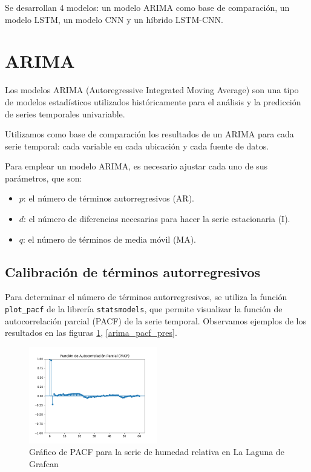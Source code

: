 Se desarrollan 4 modelos: un modelo ARIMA como base de comparación, un modelo LSTM, un modelo CNN y un híbrido LSTM-CNN.

\section{ARIMA}
Los modelos ARIMA (Autoregressive Integrated Moving Average) son una tipo de modelos estadísticos utilizados históricamente para el análisis y la predicción de series temporales
univariable. 

Utilizamos como base de comparación los resultados de un ARIMA para cada serie temporal: cada variable en cada ubicación y cada fuente de datos.

Para emplear un modelo ARIMA, es necesario ajustar cada uno de sus parámetros, que son:
\begin{itemize}
    \item $p$: el número de términos autorregresivos (AR).
    \item $d$: el número de diferencias necesarias para hacer la serie estacionaria (I).
    \item $q$: el número de términos de media móvil (MA).
\end{itemize}

\subsection{Calibración de términos autorregresivos}
Para determinar el número de términos autorregresivos, se utiliza la función \texttt{plot\_pacf} de la librería \texttt{statsmodels}, 
que permite visualizar la función de autocorrelación parcial (PACF) de la serie temporal. Observamos ejemplos de los resultados en las figuras \ref{arima_pacf_hum}, \ref{arima_pacf_pres}. 

\begin{figure}[H]
    \centering
    \includegraphics[width=0.5\textwidth]{images/arima_pacf_hum.png}
    \caption{Gráfico de PACF para la serie de humedad relativa en La Laguna de Grafcan}
    \label{arima_pacf_hum}
\end{figure}

